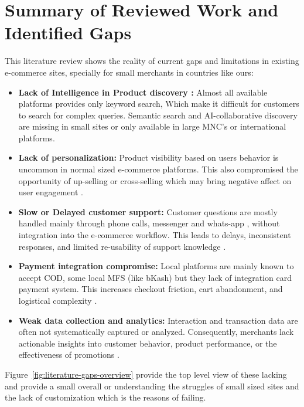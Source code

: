 \section{Summary of Reviewed Work and Identified Gaps}
This literature review shows the reality of current gaps and limitations in existing e-commerce sites, specially for small merchants in countries like ours: 

\begin{itemize}
  \item \textbf{Lack of Intelligence in Product discovery :} 
  Almost all available platforms provides only keyword search, Which make it difficult for customers to search for complex queries. Semantic search  and AI-collaborative discovery are missing in small sites or only available in large MNC's or international platforms\cite{reimers2019sentence}. 
  \item \textbf{Lack of personalization:} 
  Product visibility based on users behavior is uncommon in normal sized e-commerce platforms. This also compromised the opportunity of up-selling or cross-selling which may bring negative affect on user engagement \cite{ricci2015recommender}.
  \item \textbf{Slow or Delayed customer support:} Customer questions are mostly  handled mainly through phone calls, messenger and whats-app , without integration into the e-commerce workflow. This leads to delays, inconsistent responses, and limited re-usability of support knowledge \cite{adamopoulou2020chatbots}.
  \item \textbf{Payment integration compromise:} 
  Local platforms are mainly known to accept COD, some local MFS (like bKash) but they lack of integration card payment system. This increases checkout friction, cart abandonment, and logistical complexity \cite{lee2020checkout,hasan2021mobile,rahman2018cod}.
  \item \textbf{Weak data collection and analytics:} Interaction and transaction data are often not systematically captured or analyzed.  Consequently, merchants lack actionable insights into customer behavior, product performance, or the effectiveness of promotions \cite{laudon2021ecommerce}. 
\end{itemize}

Figure~\ref{fig:literature-gaps-overview} provide the top level view of these lacking and provide a small overall or understanding the struggles of small sized  sites and the lack of customization which is the reasons of failing.

